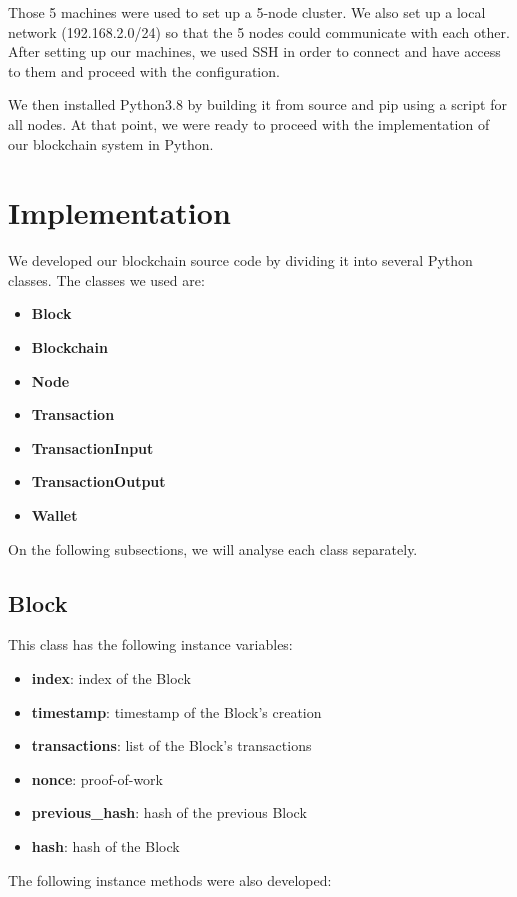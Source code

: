 \documentclass[conference]{IEEEtran}
\begin{document}
Those 5 machines were used to set up a 5-node cluster. We also set up a local network (192.168.2.0/24) so that the 5 nodes could communicate with each other. After setting up our machines, we used SSH in order to connect and have access to them and proceed with the configuration.

We then installed Python3.8 \cite{b1} by building it from source and pip \cite{b5} using a script for all nodes. At that point, we were ready to proceed with the implementation of our blockchain system in Python.

\section{\textbf{Implementation}}
We developed our blockchain source code by dividing it into several Python classes. The classes we used are:

\begin{itemize}
\item \textbf{Block}
\item \textbf{Blockchain}
\item \textbf{Node}
\item \textbf{Transaction}
\item \textbf{TransactionInput}
\item \textbf{TransactionOutput}
\item \textbf{Wallet}
\end{itemize}

On the following subsections, we will analyse each class separately.

\subsection{Block}
This class has the following instance variables:

\begin{itemize}
\item \textbf{index}: index of the Block
\item \textbf{timestamp}: timestamp of the Block's creation
\item \textbf{transactions}: list of the Block's transactions
\item \textbf{nonce}: proof-of-work
\item \textbf{previous\_hash}: hash of the previous Block
\item \textbf{hash}: hash of the Block
\end{itemize}

The following instance methods were also developed:
\end{document}
